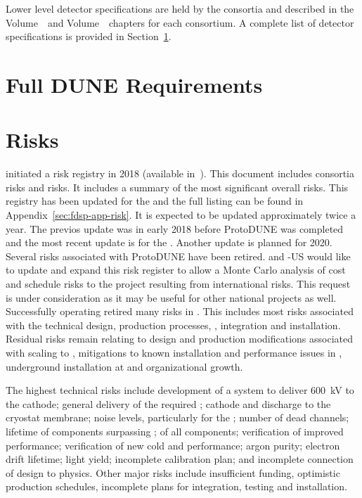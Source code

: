 Lower level detector specifications are held by the consortia and
described in the   
Volume~\volnumbersp\ and  Volume~\volnumberdp\ chapters for
each consortium. A complete list of detector specifications is
provided in Section~\ref{sec:fdsp-app-requirements}.

\section{Full DUNE Requirements}
\label{sec:fdsp-app-requirements}



\section{Risks}
\label{sec:fdsp-coord-risks}

 initiated a risk registry in 2018 (available
in~). This document includes consortia risks and
 risks. It includes a summary of the most significant
overall  risks.  This registry has been updated for the
 and the full listing can be found in
Appendix~\ref{sec:fdsp-app-risk}. It is expected to be updated
approximately twice a year. The previos update was in early 2018
before ProtoDUNE was completed and the most recent update is for the
. Another update is planned for 2020. Several risks
associated with ProtoDUNE have been retired.  and
-US would like  to update and expand this risk
register to allow a Monte Carlo analysis of cost and schedule risks to
the  project resulting from international 
risks. This request is under consideration as it may be useful for
other national projects as well.  Successfully operating
 retired many  risks in
. This includes most risks associated with the technical
design, production processes, , integration and
installation. Residual risks remain relating to design and production
modifications associated with scaling to , mitigations to
known installation and performance issues in ,
underground installation at \surf and organizational growth.

The highest technical risks include development of a system to
deliver \SI{600}{kV} to the \dual cathode; general delivery of the
required ; cathode and  discharge to the cryostat
membrane; noise levels, particularly for the ; 
number of dead channels; lifetime of components surpassing \dunelifetime{}; 
 of all components; verification of improved 
performance; verification of new cold   and   performance;
argon purity; electron drift lifetime; \phel light yield;
incomplete calibration plan; and incomplete connection of design to
physics. Other major risks include insufficient funding, optimistic
production schedules, incomplete plans for integration, testing and installation.

